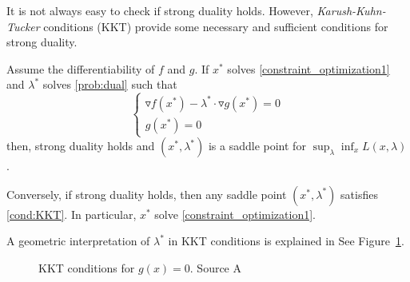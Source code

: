 \documentclass[11pt]{book}
\begin{document}
It is not always easy to check if strong duality holds. 
However, \emph{Karush-Kuhn-Tucker} conditions (KKT) provide some necessary and sufficient conditions for strong duality.
\begin{thm}
Assume the differentiability of $f$ and $g$.
    If $x^*$ solves \eqref{constraint_optimization1}  and $\lambda^*$ solves \eqref{prob:dual} such that 
    \begin{equation} \label{cond:KKT}
    \begin{cases} \triangledown f(x^*) - \lambda^* \cdot \triangledown g(x^*) = 0\\
            g (x^*)=0
        \end{cases}
    \end{equation}
    then, strong duality holds and $(x^*,\lambda^*)$ is a saddle point for $\sup_{\lambda}\inf_{x}L(x,\lambda)$. 

    Conversely, if strong duality holds, then any saddle point $(x^*,\lambda^*)$ satisfies \eqref{cond:KKT}. 
    In particular, $x^*$ solve \eqref{constraint_optimization1}.
\end{thm}
A geometric interpretation of $\lambda^*$ in KKT conditions is explained in See Figure~\ref{fig:KKT_1}.
\begin{figure}
    \centering

    \caption{KKT conditions for $g(x)=0$. Source A}
    \label{fig:KKT_1}
\end{figure}
             
\end{document}
